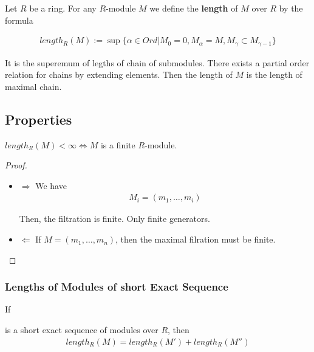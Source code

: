 \documentclass[Total.tex]{subfiles}
\begin{document}
		\begin{Def}
			Let $R$ be a ring. For any $R$-module $M$ we define the \textbf{length} of $M$ over $R$ by the formula
			
			\begin{gather*}
				length_R(M):=\sup\{\alpha\in Ord|M_0=0,M_\alpha=M,M_{\gamma}\subset M_{\gamma-1}\}
			\end{gather*}
		\end{Def}
		
		It is the superemum of legths of chain of submodules. There exists a partial order relation for chains by extending elements. Then the length of $M$ is the length of maximal chain.
		
		\subsection{Properties}
		
		\begin{lemma}
			$length_R(M)<\infty\Leftrightarrow M$ is a finite $R$-module.
		\end{lemma}
		
		\begin{proof}
			\begin{itemize}
				\item $\Rightarrow$ We have
				\begin{gather*}
					M_i=(m_1,\dots,m_i)
				\end{gather*}
				
				Then, the filtration is finite. Only finite generators.
				\item $\Leftarrow$ If $M=(m_1,\dots,m_n)$, then the maximal filration must be finite.
			\end{itemize}
		\end{proof}
		
		\subsubsection{Lengths of Modules of short Exact Sequence}
		
		\begin{lemma}
			If 
			\begin{center}
			\end{center}
			is a short exact sequence of modules over $R$, then 
			\begin{gather*}
				length_R(M)=length_R(M')+length_R(M'')
			\end{gather*}
		\end{lemma}
		
\end{document}
